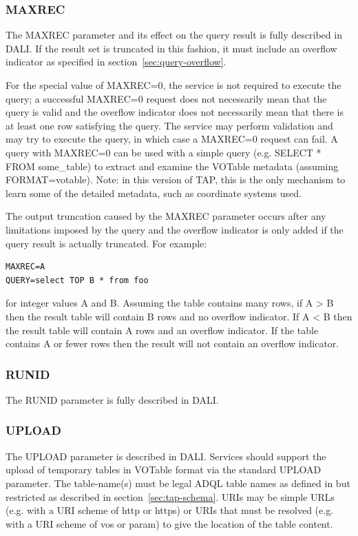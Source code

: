 \documentclass[11pt,letter]{ivoa}
\begin{document}
\subsubsection{MAXREC}
\label{sec:MAXREC}

The MAXREC parameter and its effect on the query result is fully described in 
DALI. If the result set is truncated in this fashion, it must 
include an overflow indicator as specified in section~\ref{sec:query-overflow}.

For the special value of MAXREC=0, the service is not required to execute the 
query; a successful  MAXREC=0 request does not necessarily mean that the query 
is valid and the overflow indicator does not necessarily mean that there is at 
least one row satisfying the query. The service may perform validation and may 
try to execute the query, in which case a MAXREC=0 request can fail. A query 
with MAXREC=0 can be used with a simple query (e.g. SELECT * FROM  
some\_table) to extract and examine the VOTable metadata (assuming 
FORMAT=votable). Note: in this version of TAP, this is the only mechanism to 
learn some of the detailed metadata, such as coordinate systems used.

The output truncation caused by the MAXREC parameter occurs after any 
limitations imposed by the query and the overflow indicator is only added if 
the query result is actually truncated. For example:

\begin{verbatim}
MAXREC=A
QUERY=select TOP B * from foo
\end{verbatim}

for integer values A and B. Assuming the table contains many rows, if A > B 
then the result table will contain B rows and no overflow indicator. If A < B 
then the result table will contain A rows and an overflow indicator. If the 
table contains A or fewer rows then the result will not contain an overflow 
indicator.

\subsubsection{RUNID}
The RUNID parameter is fully described in DALI.

\subsubsection{UPLOAD}
\label{sec:UPLOAD}

The UPLOAD parameter is described in DALI. Services should support 
the 
upload of temporary tables in VOTable \citep{std:VOTable} format via the standard 
UPLOAD 
parameter. The table-name(s) must be legal ADQL table names as defined in 
\citet{std:ADQL} but restricted as described in section~\ref{sec:tap-schema}. 
URIs may be simple URLs (e.g. with a URI scheme of http or https) or 
URIs that must be resolved (e.g. with a URI scheme of vos or param) to give 
the location of the table content.
\end{document}
